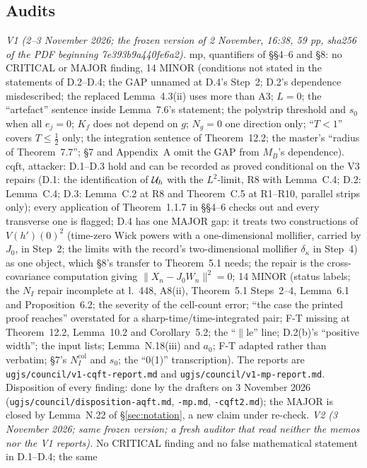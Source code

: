 \subsection*{Audits}
\emph{V1 (2--3 November 2026; the frozen version of 2 November, 16:38, 59 pp, sha256 of the PDF
beginning 7e393b9a440fe6a2).} mp, quantifiers of \S\S4--6 and \S8: no CRITICAL or MAJOR
finding, 14 MINOR (conditions not stated in the statements of D.2--D.4; the GAP unnamed at D.4's
Step~2; D.2's dependence misdescribed; the replaced Lemma~4.3(ii) uses more than A3; $L=0$;
the ``artefact'' sentence inside Lemma~7.6's statement; the polystrip threshold and $s_0$ when
all $e_j=0$; $K_f$ does not depend on $g$; $N_g=0$ one direction only; ``$T<1$'' covers $T\le\frac12$
only; the integration sentence of Theorem~12.2; the master's ``radius of Theorem~7.7''; \S7 and
Appendix~A omit the GAP from $M_B$'s dependence). cqft, attacker: D.1--D.3 hold and can be
recorded as proved conditional on the V3 repairs (D.1: the identification of $\mathcal U_h$ with the
$L^2$-limit, R8 with Lemma~C.4; D.2: Lemma~C.4; D.3: Lemma~C.2 at R8 and Theorem~C.5 at R1--R10,
parallel strips only); every application of Theorem~1.1.7 in \S\S4--6 checks out and every
transverse one is flagged; D.4 has one MAJOR gap: it treats two constructions of $V(h')(0)^2$
(time-zero Wick powers with a one-dimensional mollifier, carried by $J_0$, in Step~2; the limits
with the record's two-dimensional mollifier $\delta_\kappa$ in Step~4) as one object, which
\S8's transfer to Theorem~5.1 needs; the repair is the cross-covariance computation giving
$\|X_n-J_0W_n\|^2=0$; 14 MINOR (status labels; the $N_I$ repair incomplete at l.~448, A8(ii),
Theorem~5.1 Steps~2--4, Lemma~6.1 and Proposition~6.2; the severity of the cell-count error;
``the case the printed proof reaches'' overstated for a sharp-time/time-integrated pair; F-T
missing at Theorem~12.2, Lemma~10.2 and Corollary~5.2; the ``$\|$le'' line; D.2(b)'s ``positive
width''; the input lists; Lemma~N.18(iii) and $a_0$; F-T adapted rather than verbatim; \S7's
$N^{\mathrm{col}}_I$ and $s_0$; the ``0(1)'' transcription). The reports are
\texttt{ugjs/council/v1-cqft-report.md} and \texttt{ugjs/council/v1-mp-report.md}.
Disposition of every finding: done by the drafters on 3 November 2026 (\texttt{ugjs/council/disposition-aqft.md}, \texttt{-mp.md}, \texttt{-cqft2.md}); the MAJOR is closed by Lemma~N.22 of \S\ref{sec:notation}, a new claim under re-check.
\emph{V2 (3 November 2026; same frozen version; a fresh auditor that read neither the memos nor
the V1 reports).} No CRITICAL finding and no false mathematical statement in D.1--D.4; the same

